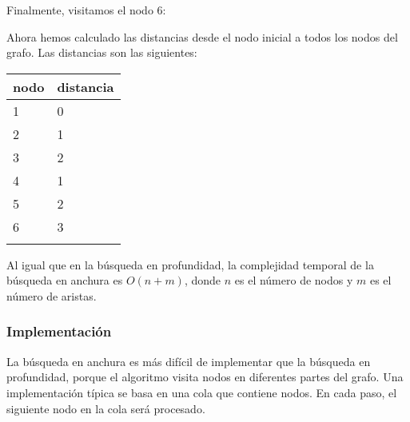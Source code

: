 Finalmente, visitamos el nodo 6:
\begin{center}
\end{center}
Ahora hemos calculado las distancias
desde el nodo inicial a todos los nodos del grafo.
Las distancias son las siguientes:

\begin{tabular}{ll}
\\
nodo & distancia \\
\hline
1 & 0 \\
2 & 1 \\
3 & 2 \\
4 & 1 \\
5 & 2 \\
6 & 3 \\
\\
\end{tabular}

Al igual que en la búsqueda en profundidad,
la complejidad temporal de la búsqueda en anchura
es $O(n+m)$, donde $n$ es el número de nodos
y $m$ es el número de aristas.

\subsubsection*{Implementación}

La búsqueda en anchura es más difícil
de implementar que la búsqueda en profundidad,
porque el algoritmo visita nodos
en diferentes partes del grafo.
Una implementación típica se basa en
una cola que contiene nodos.
En cada paso, el siguiente nodo en la cola
será procesado.

